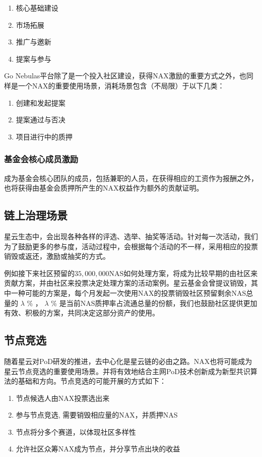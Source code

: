 \begin{enumerate}[\hspace{1cm}(a)]
  \item 核心基础建设
  \item 市场拓展
  \item 推广与邀新
  \item 提案与参与
\end{enumerate}

Go Nebulas平台除了是一个投入社区建设，获得NAX激励的重要方式之外，也同样是一个NAX的重要使用场景，消耗场景包含（不局限）于以下几类：
\begin{enumerate}[\hspace{1cm}(a)]
  \item 创建和发起提案
  \item 提案通过与否决
  \item 项目进行中的质押
\end{enumerate}

\subsubsection{基金会核心成员激励}
成为基金会核心团队的成员，包括兼职的人员，在获得相应的工资作为报酬之外，也将获得由基金会质押所产生的NAX权益作为额外的贡献证明。

\subsection{链上治理场景}
星云生态中，会出现各种各样的评选、选举、抽奖等活动。针对每一次活动，我们为了鼓励更多的参与度，活动过程中，会根据每个活动的不一样，采用相应的投票销毁或返还，激励或抽奖的方式。

例如接下来社区预留的$35,000,000$NAS如何处理方案，将成为比较早期的由社区来贡献方案，并由社区来投票决定处理方案的活动案例。星云基金会曾提议销毁，其中一种可能的方案是，每个月发起一次使用NAX的投票销毁社区预留剩余NAS总量的 \(\lambda\) \% ， \(\lambda\) \% 是当前NAS质押率占流通总量的份额，我们也鼓励社区提供更加有效、积极的方案，共同决定这部分资产的使用。

\subsection{节点竞选}
随着星云对PoD研发的推进，去中心化是星云链的必由之路。NAX也将可能成为星云节点竞选的重要使用场景。并将有效地结合主网PoD技术创新成为新型共识算法的基础和方向。节点竞选的可能开展的方式如下：
\begin{enumerate}[\hspace{1cm}(a)]
  \item 节点候选人由NAX投票选出来
  \item 参与节点竞选, 需要销毁相应量的NAX，并质押NAS
  \item 节点将分多个赛道，以体现社区多样性
  \item 允许社区众筹NAX成为节点，并分享节点出块的收益
\end{enumerate}

